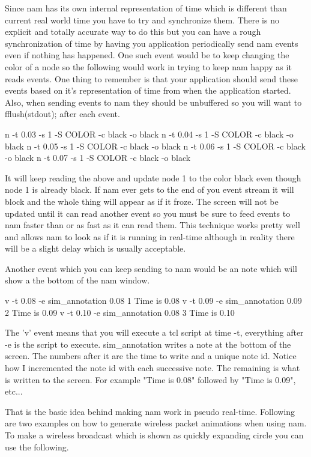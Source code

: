 Since nam has its own internal representation of time which is different
than current real world time you have to try and synchronize them.
There is no explicit and totally accurate way to do this but you can
have a rough synchronization of time by having you application
periodically send nam events even if nothing has happened.  One such
event would be to keep changing the color of a node so the following
would work in trying to keep nam happy as it reads events.  One thing to
remember is that your application should send these events based on it's
representation of time from when the application started. Also, when
sending events to nam they should be unbuffered so you will want to
fflush(stdout); after each event.
\begin{program}
n -t 0.03 -s 1 -S COLOR -c black -o black
n -t 0.04 -s 1 -S COLOR -c black -o black
n -t 0.05 -s 1 -S COLOR -c black -o black
n -t 0.06 -s 1 -S COLOR -c black -o black
n -t 0.07 -s 1 -S COLOR -c black -o black
\end{program}

It will keep reading the above and update node 1 to the color black even
though node 1 is already black.  If nam ever gets to the end of you
event stream it will block and the whole thing will appear as if it
froze.  The screen will not be updated until it can read another event
so you must be sure to feed events to nam faster than or as fast as it
can read them.  This technique works pretty well and allows nam to look
as if it is running in real-time although in reality there will be a
slight delay which is usually acceptable.

Another event which you can keep sending to nam would be an note which
will show a the bottom of the nam window.
\begin{program}
v -t 0.08 -e sim\_annotation 0.08 1 Time is 0.08
v -t 0.09 -e sim\_annotation 0.09 2 Time is 0.09
v -t 0.10 -e sim\_annotation 0.08 3 Time is 0.10
\end{program}

The 'v' event means that you will execute a tcl script at time -t,
everything after -e is the script to execute.  sim\_annotation writes a
note at the bottom of the screen.  The numbers after it are the time to
write and a unique note id.  Notice how I incremented the note id with
each successive note.   The remaining is what is written to the screen.
For example "Time is 0.08" followed by "Time is 0.09", etc...


That is the basic idea behind making nam work in pseudo real-time.
Following are two examples on how to generate wireless packet animations
when using nam.  To make a wireless broadcast which is shown as quickly
expanding circle you can use the following.

